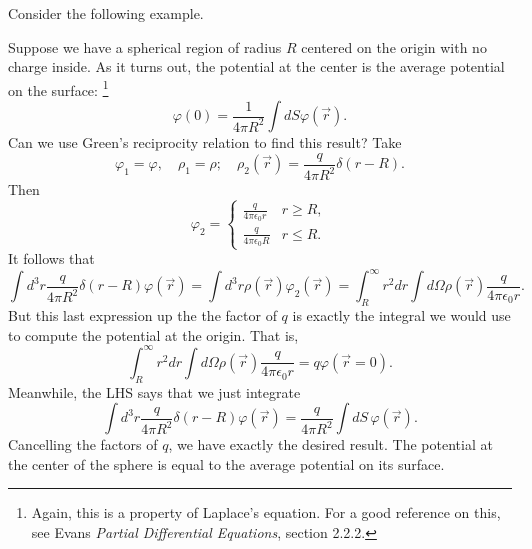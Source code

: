 Consider the following example.
\begin{exm}
    Suppose we have a spherical region of radius $R$ centered on the origin with no charge inside. As it turns out, the potential at the center is the average potential on the surface:%
        \footnote{Again, this is a property of Laplace's equation. For a good reference on this, see Evans \textit{Partial Differential Equations}, section 2.2.2.}
    \begin{equation}
        \varphi(0) = \frac{1}{4\pi R^2} \int dS \varphi(\vec r).
    \end{equation}
    Can we use Green's reciprocity relation to find this result? Take 
    \begin{equation}
        \varphi_1 = \varphi, \quad \rho_1 = \rho; \quad \rho_2(\vec r) = \frac{q}{4\pi R^2} \delta(r-R).
    \end{equation}
    Then
    \begin{equation}
        \varphi_2 = \begin{cases}
            \frac{q}{4\pi \epsilon_0 r} & r \geq R,\\
            \frac{q}{4\pi \epsilon_0 R} & r \leq R.
        \end{cases}
    \end{equation}
    It follows that
    \begin{equation}
        \int d^3 r \frac{q}{4\pi R^2} \delta(r-R) \varphi(\vec r) = \int d^3r \rho(\vec r) \varphi_2(\vec r) = \int_R^\infty r^2 dr \int d\Omega \rho(\vec r) \frac{q}{4\pi \epsilon_0 r}.
    \end{equation}
    But this last expression up the the factor of $q$ is exactly the integral we would use to compute the potential at the origin. That is,
    \begin{equation}
        \int_R^\infty r^2 dr \int d\Omega \rho(\vec r) \frac{q}{4\pi \epsilon_0 r} = q \varphi(\vec r=0).
    \end{equation}
    Meanwhile, the LHS says that we just integrate
    \begin{equation}
        \int d^3 r \frac{q}{4\pi R^2} \delta(r-R) \varphi(\vec r) = \frac{q}{4\pi R^2} \int dS \,\varphi(\vec r).
    \end{equation}
    Cancelling the factors of $q$, we have exactly the desired result. The potential at the center of the sphere is equal to the average potential on its surface.
\end{exm}

